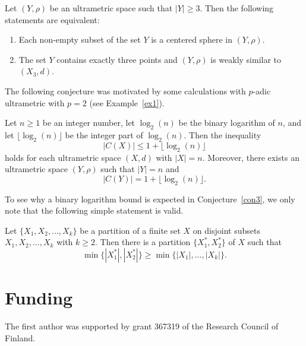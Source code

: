 \documentclass{article}
\begin{document}
\begin{Conjecture}\label{hol}
Let $(Y,\rho)$ be an ultrametric space such that $|Y|\geq 3$. Then the following statements are equivalent:
\begin{enumerate}[label=\textit{(\roman*)}, left=0pt]
\item Each non-empty subset of the set $Y$ is a centered sphere in $(Y,\rho)$.
\item The set $Y$ contains exactly three points and $(Y,\rho)$ is weakly similar to $(X_3,d)$.
\end{enumerate}
\end{Conjecture}





The following conjecture was motivated by some calculations with \(p\)-adic ultrametric with \(p=2\) (see Example~\ref{ex1}).

\begin{Conjecture}\label{con3}
Let $n \ge 1$ be an integer number, 
let $\log_2(n)$ be the binary logarithm of $n$, and let $\lfloor \log_2(n) \rfloor$ be the integer part of $\log_2(n)$.
Then the inequality
\begin{equation*}
|C(X)| \leq 1 + \lfloor \log_2 (n) \rfloor
\end{equation*}
holds for each ultrametric space $(X,d)$ with $|X|=n$.
Moreover, there exists an ultrametric space $(Y,\rho)$ such that $|Y|=n$
and
\[
|C(Y)| = 1 + \lfloor \log_2(n) \rfloor .
\]
\end{Conjecture}





To see why a binary logarithm bound is expected in Conjecture~\ref{con3}, we only note that the following simple statement is valid.

Let \(\{X_1, X_2, \dots, X_k\}\) be a partition of a finite set  \(X\) on disjoint subsets \(X_1, X_2, \dots, X_k\) with \(k \geq 2\).
Then there is a partition \(\{X_1^*, X_2^*\}\) of \(X\) such that
\[
\min\{|X_1^*|, |X_2^*|\} \geq \min\{|X_1|, \dots, |X_k|\}.
\]






\hfill






\section*{Funding}

The first author was supported by grant 367319 of the Research Council of Finland.











































 

\end{document}
